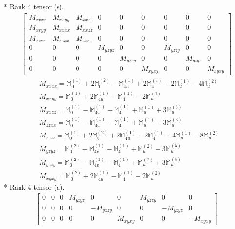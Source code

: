 \documentclass[fleqn,8pt,landscape]{jsarticle}
\begin{document}
* Rank 4 tensor (s).
\begin{align*}
\begin{bmatrix} M_{xxxx} & M_{xxyy} & M_{xxzz} & 0 & 0 & 0 & 0 & 0 & 0 \\ M_{xxyy} & M_{xxxx} & M_{xxzz} & 0 & 0 & 0 & 0 & 0 & 0 \\ M_{zzxx} & M_{zzxx} & M_{zzzz} & 0 & 0 & 0 & 0 & 0 & 0 \\ 0 & 0 & 0 & M_{yzyz} & 0 & 0 & M_{yzzy} & 0 & 0 \\ 0 & 0 & 0 & 0 & M_{yzzy} & 0 & 0 & M_{yzyz} & 0 \\ 0 & 0 & 0 & 0 & 0 & M_{xyxy} & 0 & 0 & M_{xyxy} \end{bmatrix}
\end{align*}
\begin{align*}
& M_{xxxx} = \mathbb{M}_{0}^{(1)} + 2 \mathbb{M}_{0}^{(2)} - \mathbb{M}_{4u}^{(1)} + 2 \mathbb{M}_{4}^{(1)} - 2 \mathbb{M}_{u}^{(1)} - 4 \mathbb{M}_{u}^{(2)} \\
& M_{xxyy} = \mathbb{M}_{0}^{(1)} + 2 \mathbb{M}_{4u}^{(1)} - \mathbb{M}_{4}^{(1)} - 2 \mathbb{M}_{u}^{(1)} \\
& M_{xxzz} = \mathbb{M}_{0}^{(1)} - \mathbb{M}_{4u}^{(1)} - \mathbb{M}_{4}^{(1)} + \mathbb{M}_{u}^{(1)} + 3 \mathbb{M}_{u}^{(3)} \\
& M_{zzxx} = \mathbb{M}_{0}^{(1)} - \mathbb{M}_{4u}^{(1)} - \mathbb{M}_{4}^{(1)} + \mathbb{M}_{u}^{(1)} - 3 \mathbb{M}_{u}^{(3)} \\
& M_{zzzz} = \mathbb{M}_{0}^{(1)} + 2 \mathbb{M}_{0}^{(2)} + 2 \mathbb{M}_{4u}^{(1)} + 2 \mathbb{M}_{4}^{(1)} + 4 \mathbb{M}_{u}^{(1)} + 8 \mathbb{M}_{u}^{(2)} \\
& M_{yzyz} = \mathbb{M}_{0}^{(2)} - \mathbb{M}_{4u}^{(1)} - \mathbb{M}_{4}^{(1)} + \mathbb{M}_{u}^{(2)} - 3 \mathbb{M}_{u}^{(5)} \\
& M_{yzzy} = \mathbb{M}_{0}^{(2)} - \mathbb{M}_{4u}^{(1)} - \mathbb{M}_{4}^{(1)} + \mathbb{M}_{u}^{(2)} + 3 \mathbb{M}_{u}^{(5)} \\
& M_{xyxy} = \mathbb{M}_{0}^{(2)} + 2 \mathbb{M}_{4u}^{(1)} - \mathbb{M}_{4}^{(1)} - 2 \mathbb{M}_{u}^{(2)}
\end{align*}
* Rank 4 tensor (a).
\begin{align*}
\begin{bmatrix} 0 & 0 & 0 & M_{yzyz} & 0 & 0 & M_{yzzy} & 0 & 0 \\ 0 & 0 & 0 & 0 & - M_{yzzy} & 0 & 0 & - M_{yzyz} & 0 \\ 0 & 0 & 0 & 0 & 0 & M_{xyxy} & 0 & 0 & - M_{xyxy} \end{bmatrix}
\end{align*}
\end{document}
